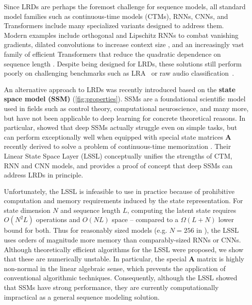 Since LRDs are perhaps {the} foremost challenge for sequence models, all standard model families such as continuous-time models (CTMs), RNNs, CNNs, and Transformers include many specialized variants designed to address them. Modern examples include orthogonal and Lipschitz RNNs \citep{arjovsky2016unitary,erichson2021lipschitz} to combat vanishing gradients, dilated convolutions to increase context size \citep{bai2018empirical,oord2016wavenet}, and an increasingly vast family of efficient Transformers that reduce the quadratic dependence on sequence length \citep{katharopoulos2020transformers,choromanski2020rethinking}. Despite being designed for LRDs, these solutions still perform poorly on challenging benchmarks such as LRA~\citep{tay2021long} or raw audio classification~\citep{gu2021lssl}.

An alternative approach to LRDs was recently introduced based on the \textbf{state space model (SSM)} (\ref{fig:properties}).
SSMs are a foundational scientific model used in fields such as control theory, computational neuroscience, and many more, but have not been applicable to deep learning for concrete theoretical reasons. In particular, \citet{gu2021lssl} showed that deep SSMs actually struggle even on simple tasks, but can perform exceptionally well when equipped with special state matrices \( \bm{A} \) recently derived to solve a problem of continuous-time memorization \citep{voelker2019legendre,gu2020hippo}. Their Linear State Space Layer (LSSL) conceptually unifies the strengths of CTM, RNN and CNN models, and provides a proof of concept that deep SSMs can address LRDs in principle.

Unfortunately, the LSSL is infeasible to use in practice because of prohibitive computation and memory requirements induced by the state representation. For state dimension \( N \) and sequence length \( L \), computing the latent state requires \( O(N^2L) \) operations and \( O(NL) \) space -- compared to a \( \Omega(L+N) \) lower bound for both. Thus for reasonably sized models (e.g. \( N=256 \) in \citet{gu2021lssl}), the LSSL uses orders of magnitude more memory than comparably-sized RNNs or CNNs. Although theoretically efficient algorithms for the LSSL were proposed, we show that these are numerically unstable. In particular, the special \( \bm{A} \) matrix is highly non-normal in the linear algebraic sense, which prevents the application of conventional algorithmic techniques. Consequently, although the LSSL showed that SSMs have strong performance, they are currently computationally impractical as a general sequence modeling solution.

